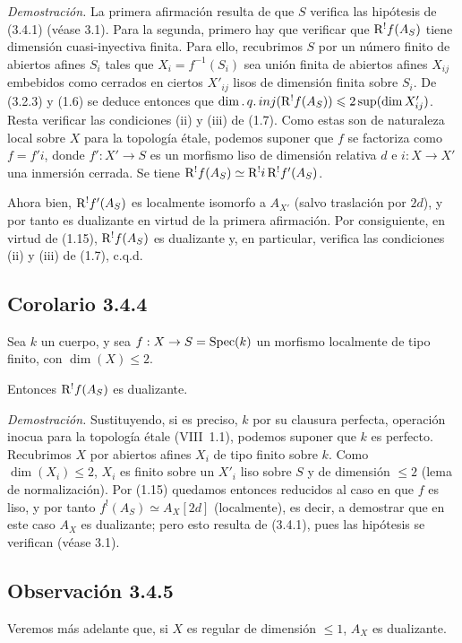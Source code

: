\emph{Demostración.} La primera afirmación resulta de que $S$ verifica las hipótesis de (3.4.1) (véase 3.1). Para la segunda, primero hay que verificar que $\mathrm{R}^{!}f(A_S)$ tiene dimensión cuasi-inyectiva finita. Para ello, recubrimos $S$ por un número finito de abiertos afines $S_i$ tales que $X_i = f^{-1}(S_i)$ sea unión finita de abiertos afines $X_{ij}$ embebidos como cerrados en ciertos $X'_{ij}$ lisos de dimensión finita sobre $S_i$. De (3.2.3) y (1.6) se deduce entonces que $\dim.\,q.\,inj(\mathrm{R}^{!}f(A_S)) \leqslant 2\sup(\dim X'_{ij})$. Resta verificar las condiciones (ii) y (iii) de (1.7). Como estas son de naturaleza local sobre $X$ para la topología étale, podemos suponer que $f$ se factoriza como $f = f'i$, donde $f' : X' \to S$ es un morfismo liso de dimensión relativa $d$ e $i : X \to X'$ una inmersión cerrada. Se tiene $\mathrm{R}^{!}f(A_S) \simeq \mathrm{R}^{!}i \, \mathrm{R}^{!}f'(A_S)$.

Ahora bien, $\mathrm{R}^{!}f'(A_S)$ es localmente isomorfo a $A_{X'}$ (salvo traslación por $2d$), y por tanto es dualizante en virtud de la primera afirmación. Por consiguiente, en virtud de (1.15), $\mathrm{R}^{!}f(A_S)$ es dualizante y, en particular, verifica las condiciones (ii) y (iii) de (1.7), c.q.d.

\subsection*{Corolario 3.4.4}
Sea $k$ un cuerpo, y sea $f : X \to S = \operatorname{Spec}(k)$ un morfismo localmente de tipo finito, con $\dim(X) \leqslant 2$.

Entonces $\mathrm{R}^{!}f(A_S)$ es dualizante.

\emph{Demostración.} Sustituyendo, si es preciso, $k$ por su clausura perfecta, operación inocua para la topología étale (VIII~1.1), podemos suponer que $k$ es perfecto. Recubrimos $X$ por abiertos afines $X_i$ de tipo finito sobre $k$. Como $\dim(X_i) \leqslant 2$, $X_i$ es finito sobre un $X'_i$ liso sobre $S$ y de dimensión $\leqslant 2$ (lema de normalización). Por (1.15) quedamos entonces reducidos al caso en que $f$ es liso, y por tanto $f^{!}(A_S) \simeq A_X[2d]$ (localmente), es decir, a demostrar que en este caso $A_X$ es dualizante; pero esto resulta de (3.4.1), pues las hipótesis se verifican (véase 3.1).

\subsection*{Observación 3.4.5}
Veremos más adelante que, si $X$ es regular de dimensión $\leqslant 1$, $A_X$ es dualizante.
